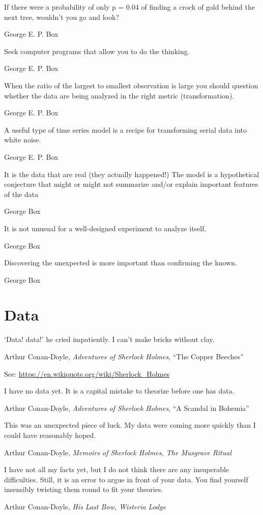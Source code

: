 \epigraph{If there were a probability of only p = 0.04 of finding a crock of gold behind the next tree, wouldn't you go and look?}{George E. P. Box}

\epigraph{Seek computer programs that allow you to do the thinking.}{George E. P. Box}

\epigraph{When the ratio of the largest to smallest observation is large you should question whether the data are being analyzed in the right metric (transformation).}{George E. P. Box}

\epigraph{A useful type of time series model is a recipe for transforming serial data into white noise.}{George E. P. Box}


\epigraph{It is the data that are real (they actually happened!) The model is a hypothetical conjecture that might or might not summarize and/or explain important features of the data}{George Box}

\epigraph{It is not unusual for a well-designed experiment to analyze itself.}{George Box}

\epigraph{Discovering the unexpected is more important than confirming the known.}{George Box} 




\section{Data}
\epigraph{`Data! data!' he cried impatiently.  I can't make bricks without clay.}{Arthur Conan-Doyle, \emph{Adventures of Sherlock Holmes}, ``The Copper Beeches''}

See: \url{https://en.wikiquote.org/wiki/Sherlock_Holmes}

\epigraph{I have no data yet. It is a capital mistake to theorize before one has data.}{Arthur Conan-Doyle, \emph{Adventures of Sherlock Holmes}, ``A Scandal in Bohemia''}

\epigraph{This was an unexpected piece of luck. My data were coming more quickly than I could have reasonably hoped.}{Arthur Conan-Doyle, \emph{Memoirs of Sherlock Holmes, The Musgrave Ritual}}


\epigraph{I have not all my facts yet, but I do not think there are any insuperable difficulties. Still, it is an error to argue in front of your data. You find yourself insensibly twisting them round to fit your theories.}{Arthur Conan-Doyle, \emph{His Last Bow, Wisteria Lodge}}


